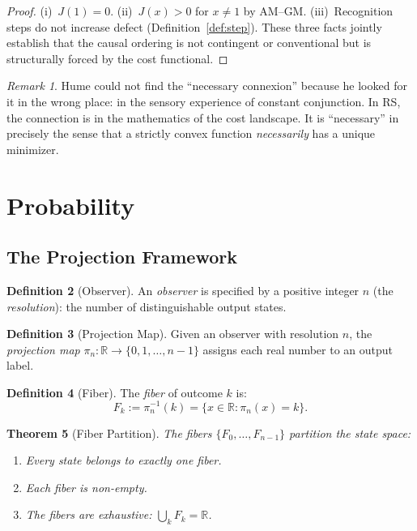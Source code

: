 \documentclass[12pt,a4paper]{article}
\newtheorem{theorem}{Theorem}[section]
\theoremstyle{definition}
\newtheorem{definition}[theorem]{Definition}
\theoremstyle{remark}
\newtheorem{remark}[theorem]{Remark}
\begin{document}
\begin{proof}
(i)~$J(1) = 0$.  (ii)~$J(x) > 0$ for $x \neq 1$ by AM--GM.
(iii)~Recognition steps do not increase defect (Definition~\ref{def:step}).
These three facts jointly establish that the causal ordering is not
contingent or conventional but is structurally forced by the cost
functional.
\end{proof}

\begin{remark}
Hume could not find the ``necessary connexion'' because he looked for it
in the wrong place: in the sensory experience of constant conjunction.
In RS, the connection is in the mathematics of the cost landscape.  It
is ``necessary'' in precisely the sense that a strictly convex function
\emph{necessarily} has a unique minimizer.
\end{remark}

\section{Probability}
\label{sec:probability}

\subsection{The Projection Framework}

\begin{definition}[Observer]
\label{def:observer}
An \emph{observer} is specified by a positive integer $n$ (the
\emph{resolution}): the number of distinguishable output states.
\end{definition}

\begin{definition}[Projection Map]
\label{def:project}
Given an observer with resolution $n$, the \emph{projection map}
$\pi_n : \mathbb{R} \to \{0, 1, \ldots, n{-}1\}$ assigns each real
number to an output label.
\end{definition}

\begin{definition}[Fiber]
\label{def:fiber}
The \emph{fiber} of outcome $k$ is:
\begin{equation}
  F_k := \pi_n^{-1}(k) = \{x \in \mathbb{R} : \pi_n(x) = k\}.
\end{equation}
\end{definition}

\begin{theorem}[Fiber Partition]
\label{thm:fiber}
The fibers $\{F_0, \ldots, F_{n-1}\}$ partition the state space:
\begin{enumerate}[label=(\roman*),nosep]
  \item Every state belongs to exactly one fiber.
  \item Each fiber is non-empty.
  \item The fibers are exhaustive: $\bigcup_k F_k = \mathbb{R}$.
\end{enumerate}
\end{theorem}
\end{document}
